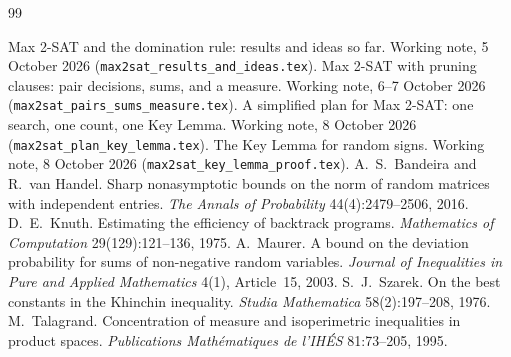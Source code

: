 \documentclass[11pt,a4paper]{article}
\theoremstyle{definition}
\theoremstyle{remark}
\begin{document}
\begin{thebibliography}{99}
\raggedright
{} Max 2-SAT and the domination rule: results and ideas so far.
 Working note, 5 October 2026 (\texttt{max2sat\_results\_and\_ideas.tex}).
 Max 2-SAT with pruning clauses: pair decisions, sums, and a
 measure. Working note, 6--7 October 2026
 (\texttt{max2sat\_pairs\_sums\_measure.tex}).
 A simplified plan for Max 2-SAT: one search, one count, one Key
 Lemma. Working note, 8 October 2026 (\texttt{max2sat\_plan\_key\_lemma.tex}).
 The Key Lemma for random signs. Working note, 8 October 2026
 (\texttt{max2sat\_key\_lemma\_proof.tex}).
 A.~S.~Bandeira and R.~van Handel. Sharp nonasymptotic bounds
 on the norm of random matrices with independent entries. \emph{The Annals of
 Probability} 44(4):2479--2506, 2016.
 D.~E.~Knuth. Estimating the efficiency of backtrack
 programs. \emph{Mathematics of Computation} 29(129):121--136, 1975.
 A.~Maurer. A bound on the deviation probability for sums of
 non-negative random variables. \emph{Journal of Inequalities in Pure and
 Applied Mathematics} 4(1), Article~15, 2003.
 S.~J.~Szarek. On the best constants in the Khinchin inequality.
 \emph{Studia Mathematica} 58(2):197--208, 1976.
 M.~Talagrand. Concentration of measure and isoperimetric
 inequalities in product spaces. \emph{Publications Math\'ematiques de
 l'IH\'ES} 81:73--205, 1995.
\end{thebibliography}
\end{document}
